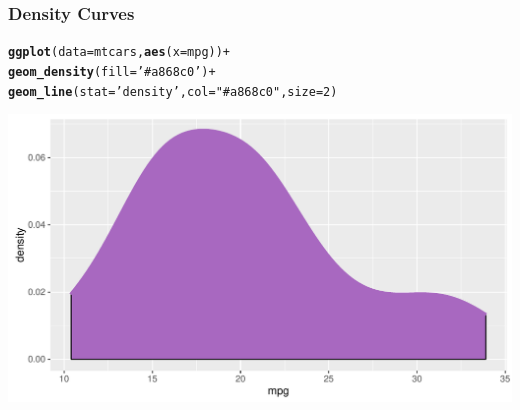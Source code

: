 \documentclass[12pt]{beamer}\usepackage[]{graphicx}\usepackage[]{color}
\makeatletter
\newcommand{\hlnum}[1]{\textcolor[rgb]{0.686,0.059,0.569}{#1}}%
\newcommand{\hlstr}[1]{\textcolor[rgb]{0.192,0.494,0.8}{#1}}%
\newcommand{\hlopt}[1]{\textcolor[rgb]{0,0,0}{#1}}%
\newcommand{\hlstd}[1]{\textcolor[rgb]{0.345,0.345,0.345}{#1}}%
\newcommand{\hlkwc}[1]{\textcolor[rgb]{0.333,0.667,0.333}{#1}}%
\newcommand{\hlkwd}[1]{\textcolor[rgb]{0.737,0.353,0.396}{\textbf{#1}}}%
\newenvironment{kframe}{%
 \def\at@end@of@kframe{}%
 \ifinner\ifhmode%
  \def\at@end@of@kframe{\end{minipage}}%
  \begin{minipage}{\columnwidth}%
 \fi\fi%
 \def\FrameCommand##1{\hskip\@totalleftmargin \hskip-\fboxsep
 \colorbox{shadecolor}{##1}\hskip-\fboxsep
     \hskip-\linewidth \hskip-\@totalleftmargin \hskip\columnwidth}%
 \MakeFramed {\advance\hsize-\width
   \@totalleftmargin\z@ \linewidth\hsize
   \@setminipage}}%
 {\par\unskip\endMakeFramed%
 \at@end@of@kframe}
\newenvironment{knitrout}{}{} %
\makeatother
\begin{document}
\begin{frame}[fragile]
\frametitle{Density Curves}

\begin{knitrout}\scriptsize
{}\color{fgcolor}\begin{kframe}
\begin{alltt}
\hlkwd{ggplot}\hlstd{(}\hlkwc{data} \hlstd{= mtcars,} \hlkwd{aes}\hlstd{(}\hlkwc{x} \hlstd{= mpg))} \hlopt{+}
  \hlkwd{geom_density}\hlstd{(}\hlkwc{fill} \hlstd{=} \hlstr{'#a868c0'}\hlstd{)} \hlopt{+}
  \hlkwd{geom_line}\hlstd{(}\hlkwc{stat} \hlstd{=} \hlstr{'density'}\hlstd{,} \hlkwc{col} \hlstd{=} \hlstr{"#a868c0"}\hlstd{,} \hlkwc{size} \hlstd{=} \hlnum{2}\hlstd{)}
\end{alltt}
\end{kframe}

{\centering \includegraphics[width=.9\linewidth,height=.5\linewidth]{figure/unnamed-chunk-24-1} 

}



\end{knitrout}

\end{frame}


\begin{frame}
\begin{center}
\Huge{}
\end{center}
\end{frame}

\end{document}
